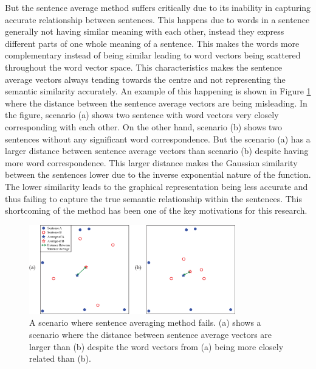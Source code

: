 \documentclass[acmlarge]{acmart}
\begin{document}
But the sentence average method suffers critically due to its inability in capturing accurate relationship between sentences. This happens due to words in a sentence generally not having similar meaning with each other, instead they express different parts of one whole meaning of a sentence. This makes the words more complementary instead of being similar leading to word vectors being scattered throughout the word vector space. This characteristics makes the sentence average vectors always tending towards the centre and not representing the semantic similarity accurately. An example of this happening is shown in Figure \ref{fig:sarkar-problem} where the distance between the sentence average vectors are being misleading. In the figure, scenario (a) shows two sentence with word vectors very closely corresponding with each other. On the other hand, scenario (b) shows two sentences without any significant word correspondence. But the scenario (a) has a larger distance between sentence average vectors than scenario (b) despite having more word correspondence. This larger distance makes the Gaussian similarity between the sentences lower due to the inverse exponential nature of the function. The lower similarity leads to the graphical representation being less accurate and thus failing to capture the true semantic relationship within the sentences. This shortcoming of the method has been one of the key motivations for this research.
\begin{figure}
	\centering
	\includegraphics[width=0.8\textwidth]{figs/sarkar_problem-edited}
	\caption{A scenario where sentence averaging method fails. (a) shows a scenario where the distance between sentence average vectors are larger than (b) despite the word vectors from (a) being more closely related than (b).}
	\label{fig:sarkar-problem}
\end{figure}
\end{document}
